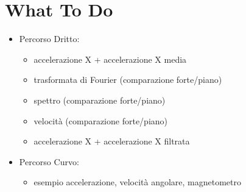 \documentclass[class=article]{standalone}
\begin{document}
	\section{What To Do}	
	\begin{itemize}
		\item Percorso Dritto:
		\begin{itemize}
			\item accelerazione X + accelerazione X media
			\item trasformata di Fourier (comparazione forte/piano)
			\item spettro (comparazione forte/piano)
			\item velocità (comparazione forte/piano)
			\item accelerazione X + accelerazione X filtrata
		\end{itemize}
		
		\item Percorso Curvo:
		\begin{itemize}
			\item esempio accelerazione, velocità angolare, magnetometro
		\end{itemize}
	\end{itemize}
\end{document}
